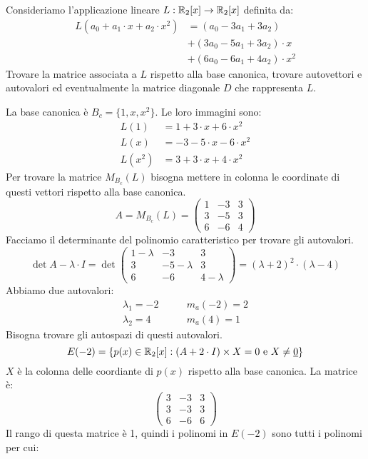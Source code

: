 \begin{exmp}
Consideriamo l'applicazione lineare $L : \mathbb{R}_2 [x] \to \mathbb{R}_2 [x]$ definita da:
\begin{align*}
L(a_0 + a_1 \cdot x + a_2 \cdot x^2) &=
(a_0 - 3 a_1 + 3 a_2) \\ 
&+ (3 a_0 - 5 a_1 + 3 a_2) \cdot x \\
&+ (6 a_0 - 6 a_1 + 4 a_2) \cdot x^2
\end{align*}
Trovare la matrice associata a $L$ rispetto alla base canonica, trovare autovettori e autovalori ed eventualmente la matrice diagonale $D$ che rappresenta $L$.

La base canonica \`e $B_c = \{ 1, x, x^2 \}$. Le loro immagini sono:
\begin{align*}
L(1) &= 1 + 3 \cdot x + 6 \cdot x^2 \\
L(x) &= -3 -5 \cdot x - 6 \cdot x^2 \\
L(x^2) &= 3 + 3 \cdot x + 4 \cdot x^2
\end{align*}
Per trovare la matrice $M_{B_c} (L)$ bisogna mettere in colonna le coordinate di questi vettori rispetto alla base canonica.
\[
A = M_{B_c} (L) =
\begin{pmatrix}
1 & -3 & 3 \\
3 & -5 & 3 \\
6 & -6 & 4
\end{pmatrix}
\]
Facciamo il determinante del polinomio caratteristico per trovare gli autovalori.
\[
\det{A - \lambda \cdot I} = 
\det{
\begin{pmatrix}
1-\lambda & -3 & 3 \\
3 & -5 - \lambda & 3 \\
6 & -6 & 4 - \lambda
\end{pmatrix}
}
=
(\lambda + 2)^2 \cdot (\lambda - 4)
\]
Abbiamo due autovalori:
\begin{align*}
\lambda_1 = -2 &\qquad m_a(-2) = 2 \\
\lambda_2 = 4 &\qquad m_a(4) = 1
\end{align*}
Bisogna trovare gli autospazi di questi autovalori.
\[
E(-2) = \left\{ p(x) \in \mathbb{R}_2 [x] : (A + 2 \cdot I) \times X = 0 \text{ e } X \neq \underline{0} \right\}
\]
$X$ \`e la colonna delle coordiante di $p(x)$ rispetto alla base canonica. La matrice \`e:
\[
\begin{pmatrix}
3 & -3 & 3 \\
3 & -3 & 3 \\
6 & -6 & 6
\end{pmatrix}
\]
Il rango di questa matrice \`e 1, quindi i polinomi in $E(-2)$ sono tutti i polinomi per cui:

\end{exmp}
